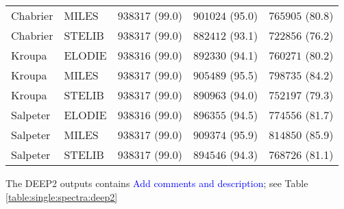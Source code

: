 \documentclass[onecolumn]{aa}
\begin{document}
\begin{table*}
\begin{center}
\begin{tabular}{ll rrr}
Chabrier & MILES & $938317$ (99.0) & $901024$ (95.0) & $765905$ (80.8) \\ 
Chabrier & STELIB & $938317$ (99.0) & $882412$ (93.1) & $722856$ (76.2) \\ 
Kroupa & ELODIE & $938316$ (99.0) & $892330$ (94.1) & $760271$ (80.2) \\ 
Kroupa & MILES & $938317$ (99.0) & $905489$ (95.5) & $798735$ (84.2) \\ 
Kroupa & STELIB & $938317$ (99.0) & $890963$ (94.0) & $752197$ (79.3) \\ 
Salpeter & ELODIE & $938316$ (99.0) & $896355$ (94.5) & $774556$ (81.7) \\ 
Salpeter & MILES & $938317$ (99.0) & $909374$ (95.9) & $814850$ (85.9) \\ 
Salpeter & STELIB & $938317$ (99.0) & $894546$ (94.3) & $768726$ (81.1) \\ 
\hline 
\end{tabular}
\end{center}
\end{table*}

The DEEP2 outputs contains \textcolor{blue}{Add comments and description}; see Table \ref{table:single:spectra:deep2}
\end{document}
